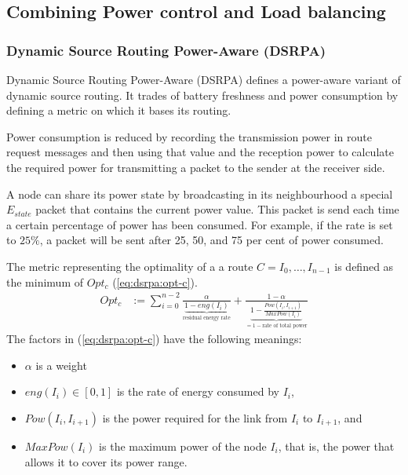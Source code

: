 
\subsection{Combining Power control and Load balancing}

\subsubsection{Dynamic Source Routing Power-Aware (DSRPA)}
\label{dsrpa}
Dynamic Source Routing Power-Aware (DSRPA)\cite{djenouri2006new} defines a
power-aware variant of dynamic source routing.
 It trades of battery freshness and power consumption by defining a
metric on which it bases its routing.

Power consumption is reduced by recording the transmission power in route
request messages and then using that value and the reception power to calculate
the required power for transmitting a packet to the sender at the receiver side.

A node can share its power state by broadcasting in its neighbourhood a special
$E_{state}$ packet that contains the current power value. This packet is send
each time a certain percentage of power has been consumed. For example, if the
rate is set to $25\%$, a packet will be sent after 25, 50, and 75 per cent of
power consumed.

The metric representing the optimality of a a route $C=I_{0}, \ldots, I_{n-1}$
is defined as the minimum of $Opt_{c}$ (\ref{eq:dsrpa:opt-c}).
\begin{align}
Opt_{c} &:= \sum_{i=0}^{n-2} \frac{\alpha}{\underbrace{1-eng(I_{i})}_{\text{residual energy rate}}} + \frac{1-\alpha}{\underbrace{1-\frac{Pow(I_{i}, I_{i+1})}{MaxPow(I_{i})}}_{= 1 - \text{rate of total power}}}
\label{eq:dsrpa:opt-c}
\end{align} 
The factors in  (\ref{eq:dsrpa:opt-c}) have the following meanings:
\begin{itemize}
    \item $\alpha$ is a weight
    \item $eng(I_{i}) \in [0,1]$ is the rate of energy consumed by $I_{i}$,
    \item $Pow(I_{i}, I_{i+1})$ is the power required for the link from $I_{i}$ to $I_{i+1}$, and
    \item $MaxPow(I_{i})$ is the maximum power of the node $I_{i}$, that is, the power that allows
          it to cover its power range.
\end{itemize}


